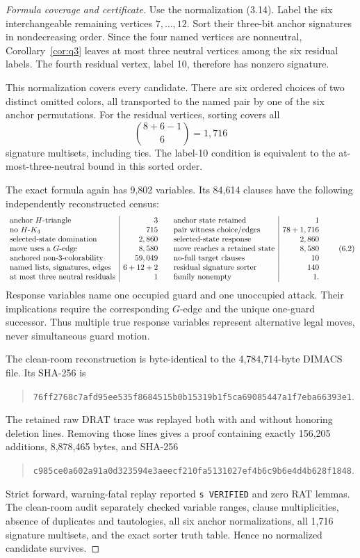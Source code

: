 \documentclass[11pt]{article}
\theoremstyle{definition}
\theoremstyle{remark}
\newcommand{\filehash}[1]{\nolinkurl{#1}}
\begin{document}
\begin{proof}[Formula coverage and certificate]
Use the normalization (3.14).  Label the six interchangeable remaining
vertices \(7,\ldots,12\).  Sort their three-bit anchor
signatures in nondecreasing order.  Since the four named vertices are
nonneutral, Corollary~\ref{cor:q3} leaves at most three neutral vertices
among the six residual labels.  The fourth residual vertex, label 10,
therefore has nonzero signature.

This normalization covers every candidate.  There are six ordered choices
of two distinct omitted colors, all transported to the named pair by one
of the six anchor permutations.  For the residual vertices, sorting covers
all
\[
  \binom{8+6-1}{6}=1,716
\tag{6.1}
\]
signature multisets, including ties.  The label-10 condition is equivalent
to the at-most-three-neutral bound in this sorted order.

The exact formula again has 9,802 variables.  Its 84,614 clauses have the
following independently reconstructed census:
\[
\begin{array}{l|r@{\qquad}l|r}
\text{anchor \(H\)-triangle}&3&
\text{anchor state retained}&1\\
\text{no \(H\)-\(K_4\)}&715&
\text{pair witness choice/edges}&78+1,716\\
\text{selected-state domination}&2,860&
\text{selected-state response}&2,860\\
\text{move uses a \(G\)-edge}&8,580&
\text{move reaches a retained state}&8,580\\
\text{anchored non-3-colorability}&59,049&
\text{no-full target clauses}&10\\
\text{named lists, signatures, edges}&6+12+2&
\text{residual signature sorter}&140\\
\text{at most three neutral residuals}&1&
\text{family nonempty}&1.
\end{array}
\tag{6.2}
\]
Response variables name one occupied guard and one unoccupied attack.
Their implications require the corresponding \(G\)-edge and the unique
one-guard successor.  Thus multiple true response variables represent
alternative legal moves, never simultaneous guard motion.

The clean-room reconstruction is byte-identical to the 4,784,714-byte
DIMACS file.  Its SHA-256 is
\begin{quote}\small
\filehash{76ff2768c7afd95ee535f8684515b0b15319b1f5ca69085447a1f7eba66393e1}.
\end{quote}
The retained raw DRAT trace was replayed both with and without honoring
deletion lines.  Removing those lines gives a proof containing exactly
156,205 additions, 8,878,465 bytes, and SHA-256
\begin{quote}\small
\filehash{c985ce0a602a91a0d323594e3aeecf210fa5131027ef4b6c9b6e4d4b628f1848}.
\end{quote}
Strict forward, warning-fatal replay reported \texttt{s VERIFIED} and zero
RAT lemmas.  The clean-room audit separately checked variable ranges,
clause multiplicities, absence of duplicates and tautologies, all six
anchor normalizations, all 1,716 signature multisets, and the exact
sorter truth table.  Hence no normalized candidate survives.
\end{proof}
\end{document}
